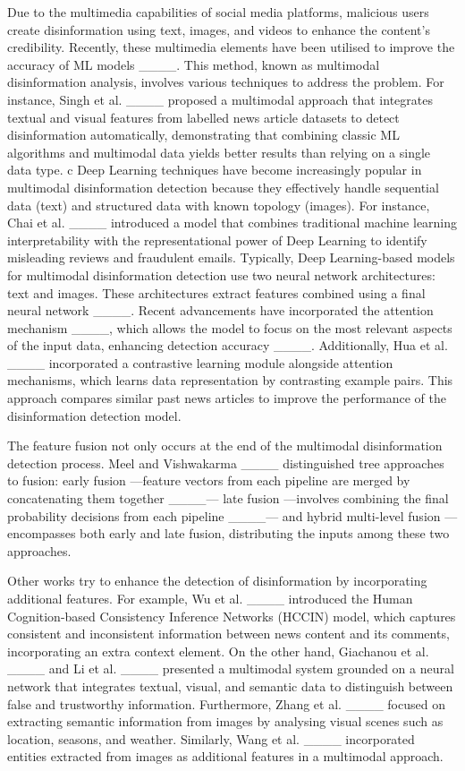 Due to the multimedia capabilities of social media platforms, malicious users create disinformation using text, images, and videos to enhance the content's credibility. Recently, these multimedia elements have been utilised to improve the accuracy of ML models ____. This method, known as multimodal disinformation analysis, involves various techniques to address the problem. For instance, Singh et al. ____ proposed a multimodal approach that integrates textual and visual features from labelled news article datasets to detect disinformation automatically, demonstrating that combining classic ML algorithms and multimodal data yields better results than relying on a single data type.
 c
Deep Learning techniques have become increasingly popular in multimodal disinformation detection because they effectively handle sequential data (text) and structured data with known topology (images). For instance, Chai et al. ____ introduced a model that combines traditional machine learning interpretability with the representational power of Deep Learning to identify misleading reviews and fraudulent emails. Typically, Deep Learning-based models for multimodal disinformation detection use two neural network architectures: text and images. These architectures extract features combined using a final neural network ____. Recent advancements have incorporated the attention mechanism ____, which allows the model to focus on the most relevant aspects of the input data, enhancing detection accuracy ____. Additionally, Hua et al. ____ incorporated a contrastive learning module alongside attention mechanisms, which learns data representation by contrasting example pairs. This approach compares similar past news articles to improve the performance of the disinformation detection model.

The feature fusion not only occurs at the end of the multimodal disinformation detection process. Meel and Vishwakarma ____ distinguished tree approaches to fusion: early fusion ---feature vectors from each pipeline are merged by concatenating them together ____--- late fusion ---involves combining the final probability decisions from each pipeline ____--- and hybrid multi-level fusion  --- encompasses both early and late fusion, distributing the inputs among these two approaches. 

Other works try to enhance the detection of disinformation by incorporating additional features. For example, Wu et al. ____ introduced the Human Cognition-based Consistency Inference Networks (HCCIN) model, which captures consistent and inconsistent information between news content and its comments, incorporating an extra context element. On the other hand, Giachanou et al. ____ and Li et al. ____ presented a multimodal system grounded on a neural network that integrates textual, visual, and semantic data to distinguish between false and trustworthy information. Furthermore, Zhang et al. ____ focused on extracting semantic information from images by analysing visual scenes such as location, seasons, and weather. Similarly, Wang et al. ____ incorporated entities extracted from images as additional features in a multimodal approach.

